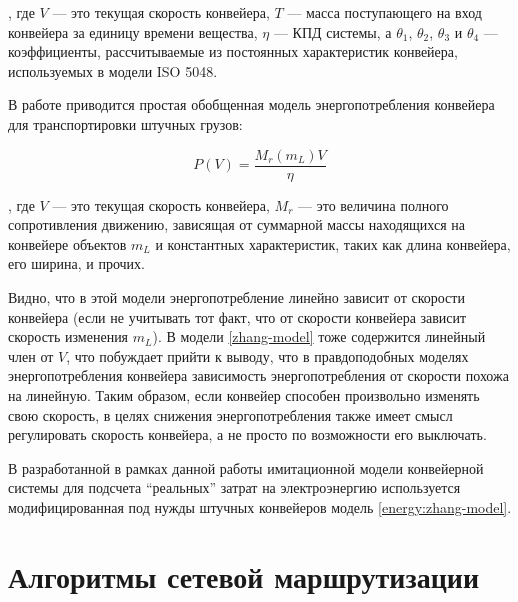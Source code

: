 \documentclass[specification,annotation,times]{itmo-student-thesis}
\theoremstyle{definition}
\newtheorem{definition-ru}{Определение}
\begin{document}
, где $V$ --- это текущая скорость конвейера, $T$ --- масса поступающего на вход
конвейера за единицу времени вещества, $\eta$ --- КПД системы, а $\theta_1$,
$\theta_2$, $\theta_3$ и $\theta_4$ --- коэффициенты, рассчитываемые из
постоянных характеристик конвейера, используемых в модели ISO 5048. 

В работе \cite{halepoto2016design} приводится простая обобщенная модель
энергопотребления конвейера для транспортировки штучных грузов:

\begin{equation}\label{energy:linear-model}
  P(V) = \frac{M_r(m_L)V}{\eta}
\end{equation}

, где $V$ --- это текущая скорость конвейера, $M_r$ --- это величина полного
сопротивления движению, зависящая от суммарной массы находящихся на конвейере
объектов $m_L$ и константных характеристик, таких как длина конвейера, его
ширина, и прочих.

Видно, что в этой модели энергопотребление линейно зависит от
скорости конвейера (если не учитывать тот факт, что от скорости конвейера
зависит скорость изменения $m_L$). В модели \ref{zhang-model} тоже содержится
линейный член от $V$, что побуждает прийти к выводу, что в правдоподобных
моделях энергопотребления конвейера зависимость энергопотребления от скорости
похожа на линейную. Таким образом, если конвейер способен произвольно изменять
свою скорость, в целях снижения энергопотребления также имеет смысл регулировать
скорость конвейера, а не просто по возможности его выключать.

В разработанной в рамках данной работы имитационной модели конвейерной системы
для подсчета ``реальных'' затрат на электроэнергию используется модифицированная
под нужды штучных конвейеров модель \ref{energy:zhang-model}.





\section{Алгоритмы сетевой маршрутизации}\label{overview:networks}
\end{document}
